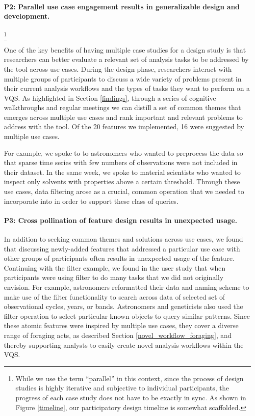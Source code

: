 {\paragraph{P2: Parallel use case engagement results in generalizable design and development.}\footnote{While we use the term ``parallel'' in this context, since the process of design studies is highly iterative and subjective to individual participants, the progress of each case study does not have to be exactly in sync. As shown in Figure \ref{timeline}, our participatory design timeline is somewhat scaffolded.} 
\par One of the key benefits of having multiple case studies for a design study is that researchers can better evaluate a relevant set of analysis tasks to be addressed by the tool across use cases. During the design phase, researchers interact with multiple groups of participants to discuss a wide variety of problems present in their current analysis workflows and the types of tasks they want to perform on a VQS. As highlighted in Section \ref{findings}, through a series of cognitive walkthroughs and regular meetings we can distill a set of common themes that emerges across multiple use cases and rank important and relevant problems to address with the tool. Of the 20 features we implemented, 16 were suggested by multiple use cases. 
\par For example, we spoke to to astronomers who wanted to preprocess the data so that sparse time series with few numbers of observations were not included in their dataset. In the same week, we spoke to material scientists who wanted to inspect only solvents with properties above a certain threshold. Through these use cases, data filtering arose as a crucial, common operation that we needed to incorporate into \zv in order to support these class of queries.
\paragraph{P3: Cross pollination of feature design results in unexpected usage.}
In addition to seeking common themes and solutions across use cases, we found that discussing newly-added features that addressed a particular use case with other groups of participants often results in unexpected usage of the feature. Continuing with the filter example, we found in the user study that when participants were using filter to do many tasks that we did not originally envision. For example, astronomers reformatted their data and naming scheme to make use of the filter functionality to search across data of selected set of observational cycles, years, or bands. Astronomers and geneticists also used the filter operation to select particular known objects to query similar patterns. Since these atomic features were inspired by multiple use cases, they cover a diverse range of foraging acts, as described Section \ref{novel_workflow_foraging}, and thereby supporting analysts to easily create novel analysis workflows within the VQS.
}
